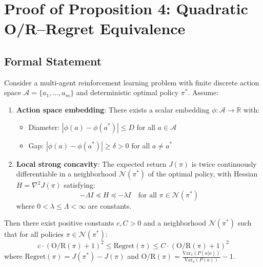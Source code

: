 \section{Proof of Proposition 4: Quadratic O/R--Regret Equivalence}
\label{app:prop4_proof}

\subsection{Formal Statement}

\begin{proposition}
\label{prop:quadratic_or_regret}
Consider a multi-agent reinforcement learning problem with finite discrete action space $\mathcal{A} = \{a_1, \ldots, a_m\}$ and deterministic optimal policy $\pi^*$. Assume:
\begin{enumerate}[label=(\roman*)]
    \item \textbf{Action space embedding}: There exists a scalar embedding $\phi: \mathcal{A} \to \mathbb{R}$ with:
    \begin{itemize}
        \item Diameter: $|\phi(a) - \phi(a^*)| \le D$ for all $a \in \mathcal{A}$
        \item Gap: $|\phi(a) - \phi(a^*)| \ge \delta > 0$ for all $a \neq a^*$
    \end{itemize}
    \item \textbf{Local strong concavity}: The expected return $J(\pi)$ is twice continuously differentiable in a neighborhood $\mathcal{N}(\pi^*)$ of the optimal policy, with Hessian $H = \nabla^2 J(\pi)$ satisfying:
    \begin{equation}
        -\Lambda I \preceq H \preceq -\lambda I \quad \text{for all } \pi \in \mathcal{N}(\pi^*)
    \end{equation}
    where $0 < \lambda \le \Lambda < \infty$ are constants.
\end{enumerate}

Then there exist positive constants $c, C > 0$ and a neighborhood $\mathcal{N}(\pi^*)$ such that for all policies $\pi \in \mathcal{N}(\pi^*)$:
\begin{equation}
    c \cdot (\text{O/R}(\pi) + 1)^2 \le \text{Regret}(\pi) \le C \cdot (\text{O/R}(\pi) + 1)^2
    \label{eq:quadratic_bound}
\end{equation}
where $\text{Regret}(\pi) = J(\pi^*) - J(\pi)$ and $\text{O/R}(\pi) = \frac{\text{Var}_{\pi}(P(a|o))}{\text{Var}_{\pi}(P(a))} - 1$.
\end{proposition}

